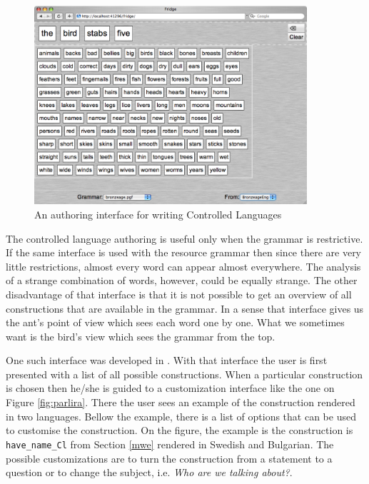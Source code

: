 \documentclass[output=paper]{LSP/langsci}
\begin{document}
\begin{figure}
\center
\includegraphics[width=0.9\textwidth]{figures/fridge-poetry-screenshot}
\caption{An authoring interface for writing Controlled Languages}
\label{fig:fridge}
\end{figure}

The controlled language authoring is useful only when the grammar
is restrictive. If the same interface is used with the resource grammar
then since there are very little restrictions, almost every word can
appear almost everywhere. The analysis of a strange combination of words,
however, could be equally strange. The other disadvantage of that 
interface is that it is not possible to get an overview of 
all constructions that are available in the grammar. In a sense that
interface gives us the ant's point of view which sees each word
one by one. What we sometimes want is the bird's view which sees the
grammar from the top. 

One such interface was developed in \cite{parlira}. With that interface 
the user is first presented with a list of all possible constructions. 
When a particular construction is chosen then he/she is guided to 
a customization interface
like the one on Figure \ref{fig:parlira}. There the user sees an example
of the construction rendered in two languages. Bellow the example,
there is a list of options that can be used to customise the construction.
On the figure, the example is the construction is \verb=have_name_Cl= from
Section \ref{mwe} rendered in Swedish and Bulgarian. The possible
customizations are to turn the construction from a statement to a question
or to change the subject, i.e. \textit{Who are we talking about?}.
\end{document}
